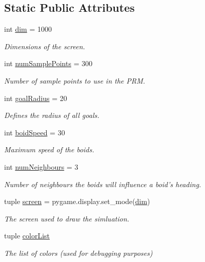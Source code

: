 \subsection*{Static Public Attributes}
\begin{DoxyCompactItemize}
\item 
int \hyperlink{classconfiguration_1_1Configuration_af63a65a65716f36cb11afd4d0e7f318f}{dim} = 1000
\begin{DoxyCompactList}\small\item\em Dimensions of the screen. \end{DoxyCompactList}\item 
int \hyperlink{classconfiguration_1_1Configuration_a35685f1f81ce810f4a429654c6b27334}{num\-Sample\-Points} = 300
\begin{DoxyCompactList}\small\item\em Number of sample points to use in the P\-R\-M. \end{DoxyCompactList}\item 
int \hyperlink{classconfiguration_1_1Configuration_a1a5fee18f20950a467d1b94d4d276c78}{goal\-Radius} = 20
\begin{DoxyCompactList}\small\item\em Defines the radius of all goals. \end{DoxyCompactList}\item 
int \hyperlink{classconfiguration_1_1Configuration_a5062047bc933b81cbbaa841e20cb2a67}{boid\-Speed} = 30
\begin{DoxyCompactList}\small\item\em Maximum speed of the boids. \end{DoxyCompactList}\item 
int \hyperlink{classconfiguration_1_1Configuration_a7eef6f8f2eb6d4a8fa4a45ddf9f6e1ba}{num\-Neighbours} = 3
\begin{DoxyCompactList}\small\item\em Number of neighbours the boids will influence a boid's heading. \end{DoxyCompactList}\item 
tuple \hyperlink{classconfiguration_1_1Configuration_a04b8c98906296ee65625d1472e037a75}{screen} = pygame.\-display.\-set\-\_\-mode(\hyperlink{classconfiguration_1_1Configuration_af63a65a65716f36cb11afd4d0e7f318f}{dim})
\begin{DoxyCompactList}\small\item\em The screen used to draw the simluation. \end{DoxyCompactList}\item 
tuple \hyperlink{classconfiguration_1_1Configuration_a2140643801852e373bfddf9945cf26f8}{color\-List}
\begin{DoxyCompactList}\small\item\em The list of colors (used for debugging purposes) \end{DoxyCompactList}\end{DoxyCompactItemize}


